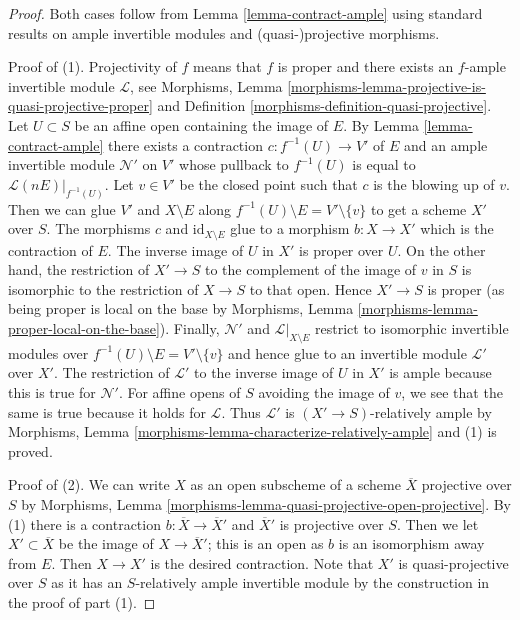 \begin{proof}
Both cases follow from Lemma \ref{lemma-contract-ample}
using standard results on ample invertible modules and
(quasi-)projective morphisms.

\medskip\noindent
Proof of (1). Projectivity of $f$ means that $f$ is proper and there exists
an $f$-ample invertible module $\mathcal{L}$, see
Morphisms, Lemma \ref{morphisms-lemma-projective-is-quasi-projective-proper}
and Definition \ref{morphisms-definition-quasi-projective}.
Let $U \subset S$ be an affine open containing the image of $E$.
By Lemma \ref{lemma-contract-ample} there exists a contraction
$c : f^{-1}(U) \to V'$ of $E$ and an ample invertible module
$\mathcal{N}'$ on $V'$ whose pullback to $f^{-1}(U)$ is equal to
$\mathcal{L}(nE)|_{f^{-1}(U)}$. Let $v \in V'$ be the closed point
such that $c$ is the blowing up of $v$.
Then we can glue $V'$ and $X \setminus E$ along
$f^{-1}(U) \setminus E = V' \setminus \{v\}$
to get a scheme $X'$ over $S$. The morphisms $c$ and
$\text{id}_{X \setminus E}$ glue to a morphism $b : X \to X'$
which is the contraction of $E$. The inverse image of $U$ in $X'$
is proper over $U$. On the other hand, the restriction of $X' \to S$
to the complement of the image of $v$ in $S$ is isomorphic to the
restriction of $X \to S$ to that open. Hence $X' \to S$ is proper
(as being proper is local on the base by
Morphisms, Lemma \ref{morphisms-lemma-proper-local-on-the-base}).
Finally, $\mathcal{N}'$ and $\mathcal{L}|_{X \setminus E}$ restrict to
isomorphic invertible modules over $f^{-1}(U) \setminus E = V' \setminus \{v\}$
and hence glue to an invertible module $\mathcal{L}'$ over $X'$.
The restriction of $\mathcal{L}'$ to the inverse image of $U$
in $X'$ is ample because this is true for $\mathcal{N}'$.
For affine opens of $S$ avoiding the image of $v$, we see that
the same is true because it holds for $\mathcal{L}$.
Thus $\mathcal{L}'$ is $(X' \to S)$-relatively ample by
Morphisms, Lemma \ref{morphisms-lemma-characterize-relatively-ample}
and (1) is proved.

\medskip\noindent
Proof of (2). We can write $X$ as an open subscheme of a scheme
$\overline{X}$ projective over $S$ by Morphisms, Lemma
\ref{morphisms-lemma-quasi-projective-open-projective}.
By (1) there is a contraction $b : \overline{X} \to \overline{X}'$
and $\overline{X}'$ is projective over $S$. Then we let
$X' \subset \overline{X}$ be the image of $X \to \overline{X}'$;
this is an open as $b$ is an isomorphism away from $E$.
Then $X \to X'$ is the desired contraction. Note that
$X'$ is quasi-projective over $S$ as it has an
$S$-relatively ample invertible module
by the construction in the proof of part (1).
\end{proof}

